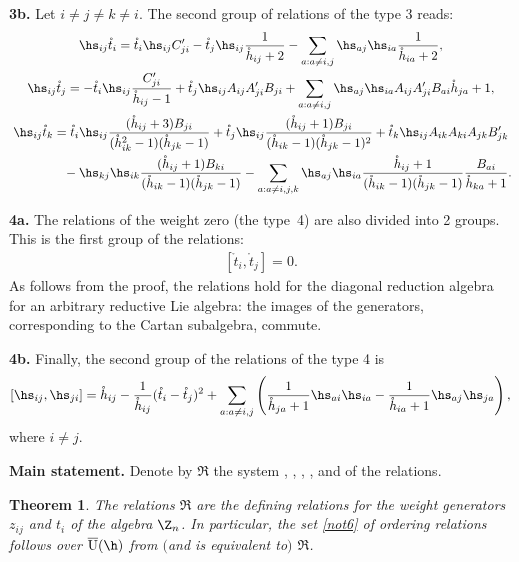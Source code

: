 \documentclass[11pt]{article}
\newtheorem{theorem}{Theorem}
\def\Cprime{C'}\def\ds{\displaystyle}\newcommand{\fracds}[2]{{\ds \frac{#1}{#2}}}
\def\nplus{\mathfrak{n}}\def\nn{\nonumber}\def\nin{\noindent}
\def\s{z}\def\S{\mathrm {S}}\def\si{\sigma}\def\Sp{\S^{\nplus}}\def\sy{\acute{\sigma}}\def\th{\mathring{h}}
\def\tphi{A}\def\tpsi{A'}\def\tphiplus{B}\def\tpsiminus{B'}\def\ttphi{B}\def\ttpsi{B'}\def\ts{\hskip1pt}\def\tts{\hskip.5pt}
\def\tt{\mathring{t}}\def\U{\mathrm{U}}\def\Uh{\overline{\U}(\h)}\def\UU{\overline{\U}}\def\UUh{{\cal{D}}(\h)}
\numberwithin{equation}{section}
\begin{document}
{\bf 3b.} Let $i\neq j\neq k\neq i$. The second group of relations of the type 3 reads:
\begin{gather}\notag\hs_{ij}\tt_{i}=  \tt_i\hs_{ij}\Cprime_{ji}-\tt_j\hs_{ij}  \frac{1}{\th_{ij}+2}-
\sum_{a:a\not=i,j}\hs_{aj}\hs_{ia}  \frac{1}{\th_{ia}+2}  ,\\
\label{3.12}\hs_{ij}\tt_{j}= -\tt_i\hs_{ij}  \frac{\Cprime_{ji}}{\th_{ij}-1}+
\tt_j\hs_{ij}\tphi_{ij}\tpsi_{ji}\ttphi_{ji}+
\sum_{a:a\not=i,j}\hs_{aj}\hs_{ia}\tphi_{ij}\tpsi_{ji}{\ttphi_{ai}}{\th_{ja}+1}  ,\\  \notag
\hs_{ij}\tt_{k}= \tt_i\hs_{ij}  \frac{(\th_{ij}+3)\ttphi_{ji}}{(\th_{ik}^2-1)(\th_{jk}-1)}+
\tt_j\hs_{ij}  \frac{(\th_{ij}+1)\ttphi_{ji}}{(\th_{ik}-1)(\th_{jk}-1)^2}+
\tt_k\hs_{ij}\tphi_{ik}\tphi_{ki}\tphi_{jk}\ttpsi_{jk}\\
  \notag
  \phantom{\hs_{ij}\tt_{k}=}{}
- \hs_{kj}\hs_{ik}  \frac{(\th_{ij}+1)\ttphi_{ki}}{(\th_{ik}-1)(\th_{jk}-1)}
-\sum_{a:a\not=i,j,k}\hs_{aj}\hs_{ia}  \frac{\th_{ij}+1}{(\th_{ik}-1)(\th_{jk}-1)}
\frac{\ttphi_{ai}}{\th_{ka}+1}  .
\end{gather}

{\bf 4a.} The relations of the weight zero (the type~4) are also divided into 2 groups.
This is the f\/irst group of the relations:
\begin{gather}
 \label{relation4a}[\tt_i,\tt_j]=0.
 \end{gather}
As follows from the proof, the relations  hold for the diagonal reduction algebra for an arbitrary reductive
Lie algebra: the images of the generators, corresponding to the Cartan subalgebra, commute.

{\bf 4b.} Finally, the second group of the relations of the type 4 is
\begin{gather}
 \label{relation4}
 [\hs_{ij},\hs_{ji}]=\th_{ij}-\frac{1}{\th_{ij}}(\tt_i-\tt_j)^2+
\sum_{a:a\not=i,j}\left(\frac{1}{\th_{ja}+1}\hs_{ai}\hs_{ia}-\frac{1}{\th_{ia}+1}\hs_{aj}\hs_{ja}\right) ,
\end{gather}
where $i\neq j$.

{\bf Main statement.} Denote by $\mathfrak{R}$  the system ,  , ,
,   and  of the relations.

\begin{theorem} \label{mthe}
The relations $\mathfrak{R}$ are the defining relations for the weight generators $\s_{ij}$ and
$t_i$ of the algebra $\Z_n$. In particular, the set  \eqref{not6} of ordering relations follows over $\Uh$ from $($and is equivalent to$)$  $\mathfrak{R}$.
\end{theorem}
\end{document}
